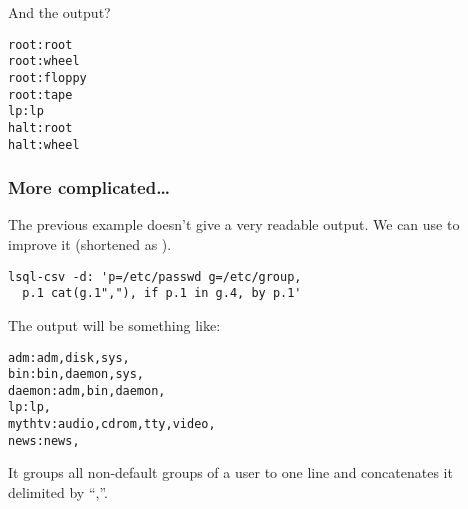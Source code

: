 And the output?
\begin{verbatim}
root:root                                                                                                                                                                                                                                                                 
root:wheel                                                                                                                                                                                                                                                                
root:floppy                                                                                                                                                                                                                                                               
root:tape                                                                                                                                                                                                                                                                 
lp:lp                                                                                                                                                                                                                                                                     
halt:root                                                                                                                                                                                                                                                                 
halt:wheel 
\end{verbatim}

\subsubsection{More complicated\ldots{}}
The previous example doesn't give a very readable output. We can use  to improve it (shortened as ).
\begin{verbatim}
lsql-csv -d: 'p=/etc/passwd g=/etc/group, 
  p.1 cat(g.1","), if p.1 in g.4, by p.1'
\end{verbatim}
The output will be something like:
\begin{verbatim}
adm:adm,disk,sys,
bin:bin,daemon,sys,
daemon:adm,bin,daemon,
lp:lp,
mythtv:audio,cdrom,tty,video,
news:news,
\end{verbatim}
It groups all non-default groups of a user to one line and concatenates it delimited by ``,''.

